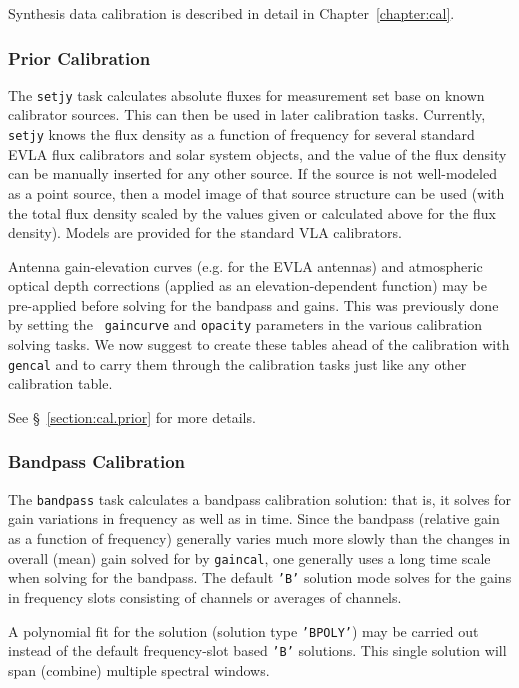 Synthesis data calibration is described in detail in
Chapter~\ref{chapter:cal}. 

\subsubsection{Prior Calibration}
\label{section:intro.walkthru.calib.prior}

The {\tt setjy} task calculates absolute fluxes for measurement set
base on known calibrator sources.  This can then be used in later
calibration tasks.  Currently, {\tt setjy} knows the flux density as a
function of frequency for several standard EVLA flux calibrators and
solar system objects, and the value of the flux density can be
manually inserted for any other source.  If the source is not
well-modeled as a point source, then a model image of that source
structure can be used (with the total flux density scaled by the
values given or calculated above for the flux density).  Models are
provided for the standard VLA calibrators.

Antenna gain-elevation curves (e.g. for the EVLA antennas) and
atmospheric optical depth corrections (applied as an
elevation-dependent function) may be pre-applied before solving for
the bandpass and gains.  This was previously done by setting the {\tt
  gaincurve} and {\tt opacity} parameters in the various calibration
solving tasks. We now suggest to create these tables ahead of the
calibration with {\tt gencal} and to carry them through the
calibration tasks just like any other calibration table.


See \S~\ref{section:cal.prior} for more details.

\subsubsection{Bandpass Calibration}
\label{section:intro.walkthru.calib.bpass}

The {\tt bandpass} task
calculates a bandpass calibration solution: that is, it solves for
gain variations in frequency as well as in time.   Since the bandpass
(relative gain as a function of frequency) generally varies much more slowly 
than the changes in overall (mean) gain solved for by {\tt gaincal}, one
generally uses a long time scale when solving for the bandpass. The
default {\tt 'B'} solution mode solves for the gains in frequency
slots consisting of channels or averages of channels.

A polynomial fit for the solution (solution type {\tt 'BPOLY'}) may be
carried out instead of the default frequency-slot based {\tt 'B'}
solutions.  This single solution will span (combine) multiple spectral
windows.


